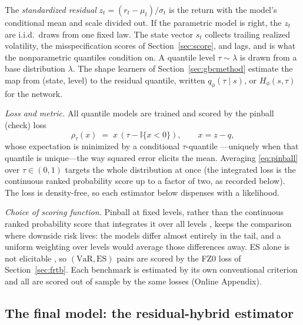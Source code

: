 \documentclass[11pt]{article}
\newcommand{\VaR}{\mathrm{VaR}}
\newcommand{\ES}{\mathrm{ES}}
\theoremstyle{remark}
\begin{document}
The \emph{standardized residual} $z_t = (r_t-\mu_t)/\sigma_t$ is the return with the model's conditional mean and scale divided out. If the parametric model is right, the $z_t$ are i.i.d.\ draws from one fixed law. The state vector $s_t$ collects trailing realized volatility, the misspecification scores of Section~\ref{sec:score}, and lags, and is what the nonparametric quantiles condition on. A quantile level $\tau \sim \lambda$ is drawn from a base distribution $\lambda$. The shape learners of Section~\ref{sec:gbcmethod} estimate the map from (state, level) to the residual quantile, written $q_\phi(\tau\mid s)$, or $H_\phi(s,\tau)$ for the network.

\noindent\emph{Loss and metric.} All quantile models are trained and
scored by the pinball (check) loss
\begin{equation}
\rho_\tau(x) \;=\; x\,(\tau - \mathbb{I}\{x<0\}),
\qquad x = z - q,
\label{eq:pinball}
\end{equation}
whose expectation is minimized by a conditional $\tau$-quantile
\citep{koenker1978, gneiting2011}---uniquely when that quantile is unique---the way squared
error elicits the mean. Averaging \eqref{eq:pinball} over $\tau\in(0,1)$
targets the whole distribution at once (the integrated loss is the
continuous ranked probability score up to a factor of two, as recorded
below). The loss is density-free, so each estimator below dispenses with a likelihood.

\emph{Choice of scoring function.} Pinball at fixed levels, rather than the continuous ranked probability score that integrates it over all levels \citep{gneitingranjan2011}, keeps the comparison where downside risk lives: the models differ almost entirely in the tail, and a uniform weighting over levels would average those differences away. ES alone is not elicitable \citep{gneiting2011}, so $(\VaR,\ES)$ pairs are scored by the FZ0 loss of Section~\ref{sec:frtb}. Each benchmark is estimated by its own conventional criterion and all are scored out of sample by the same losses (Online Appendix).

\subsection{The final model: the residual-hybrid estimator}\label{sec:hybrid}
\end{document}
